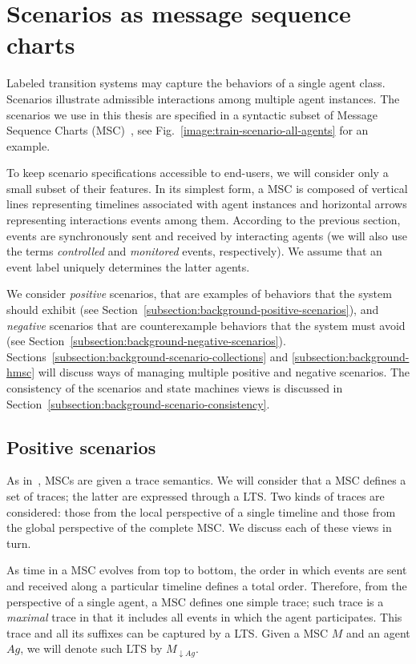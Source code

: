 \section{Scenarios as message sequence charts\label{section:background-scenarios}}

Labeled transition systems may capture the behaviors of a single agent class. Scenarios illustrate admissible interactions among multiple agent instances. The scenarios we use in this thesis are specified in a syntactic subset of Message Sequence Charts (MSC)~\cite{ITU:1996}, see Fig.~\ref{image:train-scenario-all-agents} for an example. 

To keep scenario specifications accessible to end-users, we will consider only a small subset of their features. In its simplest form, a MSC is composed of vertical lines representing timelines associated with agent instances and horizontal arrows representing interactions events among them. According to the previous section, events are synchronously sent and received by interacting agents (we will also use the terms \emph{controlled} and \emph{monitored} events, respectively). We assume that an event label uniquely determines the latter agents. 

We consider \emph{positive} scenarios, that are examples of behaviors that the system should exhibit (see Section~\ref{subsection:background-positive-scenarios}), and \emph{negative} scenarios that are counterexample behaviors that the system must avoid (see Section~\ref{subsection:background-negative-scenarios}). Sections~\ref{subsection:background-scenario-collections} and \ref{subsection:background-hmsc} will discuss ways of managing multiple positive and negative scenarios. The consistency of the scenarios and state machines views is discussed in Section~\ref{subsection:background-scenario-consistency}.

\subsection{Positive scenarios\label{subsection:background-positive-scenarios}}

As in~\cite{Uchitel:2004}, MSCs are given a trace semantics. We will consider that a MSC defines a set of traces; the latter are expressed through a LTS. Two kinds of traces are considered: those from the local perspective of a single timeline and those from the global perspective of the complete MSC. We discuss each of these views in turn.

As time in a MSC evolves from top to bottom, the order in which events are sent and received along a particular timeline defines a total order. Therefore, from the perspective of a single agent, a MSC defines one simple trace; such trace is a \emph{maximal} trace in that it includes all events in which the agent participates. This trace and all its suffixes can be captured by a LTS. Given a MSC $M$ and an agent $Ag$, we will denote such LTS by $M_{\downarrow Ag}$.

